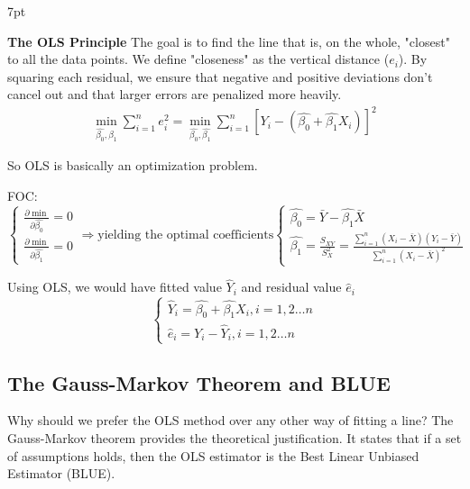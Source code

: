 \documentclass{article}
\newenvironment{greenblock}{%
\def\FrameCommand{%
  \hspace{1pt}%
    {\color{Green}%
    \vrule width 2pt}%
    {\color{greenshade}%
    \vrule width 4pt}%
  \colorbox{greenshade}%
}%
\MakeFramed{%
  \advance%
  \hsize-%
  \width%
  \FrameRestore}%
\noindent\hspace{-4.55pt}%
\begin{adjustwidth}{}{7pt}%
\vspace{2pt}\vspace{2pt}%
}
{%
\vspace{2pt}\end{adjustwidth}\endMakeFramed%
}
\begin{document}
\begin{greenblock}
\textbf{The OLS Principle}
The goal is to find the line that is, on the whole, "closest" to all the data points. We define "closeness" as the vertical distance ($e_i$). By squaring each residual, we ensure that negative and positive deviations don't cancel out and that larger errors are penalized more heavily.
\begin{align}
  \min_{\hat{\beta_0}, \hat{\beta_1}} \sum\limits_{i=1}^n e_i^2 = \min_{\hat{\beta_0}, \hat{\beta_1}} \sum\limits_{i=1}^n [Y_i-(\hat{\beta_{0}}+\hat{\beta_{1}}X_i)]^2
\end{align}
\end{greenblock}

So OLS is basically an optimization problem.

FOC:
$\begin{cases}
\frac{\partial \min}{\partial \hat{\beta_{0}}}=0
\\
\frac{\partial \min}{\partial \hat{\beta_{1}}}=0
\end{cases} \Rightarrow
\text{yielding the optimal coefficients}
\begin{cases}
\hat{\beta_{0}}=\bar Y-\hat{\beta_{1}}\bar X
\\
\hat{\beta_{1}}=\frac{S_{XY}}{S^2_X}=\frac{\sum\limits_{i=1}^n (X_i-\bar X)(Y_i-\bar Y)}{\sum\limits_{i=1}^n (X_i-\bar X)^2}
\end{cases}$


Using OLS, we would have fitted value $\hat Y_i$ and residual value $\hat e_i$
\begin{equation}
  \begin{cases}
    \hat Y_i=\hat{\beta_{0}}+\hat{\beta_{1}}X_i,i=1,2\dots n
    \\
    \hat e_i=Y_i-\hat Y_i,i=1,2\dots n
  \end{cases}
\end{equation}




\subsection{The Gauss-Markov Theorem and BLUE}

Why should we prefer the OLS method over any other way of fitting a line? The Gauss-Markov theorem provides the theoretical justification. It states that if a set of assumptions holds, then the OLS estimator is the Best Linear Unbiased Estimator (BLUE).
\end{document}
